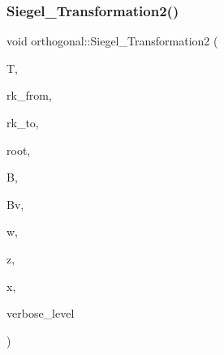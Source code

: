 \subsubsection{\texorpdfstring{Siegel\+\_\+\+Transformation2()}{Siegel\_Transformation2()}}
{\footnotesize\ttfamily void orthogonal\+::\+Siegel\+\_\+\+Transformation2 (\begin{DoxyParamCaption}\item[{\mbox{\hyperlink{galois_8h_a09fddde158a3a20bd2dcadb609de11dc}{I\+NT}} $\ast$}]{T,  }\item[{\mbox{\hyperlink{galois_8h_a09fddde158a3a20bd2dcadb609de11dc}{I\+NT}}}]{rk\+\_\+from,  }\item[{\mbox{\hyperlink{galois_8h_a09fddde158a3a20bd2dcadb609de11dc}{I\+NT}}}]{rk\+\_\+to,  }\item[{\mbox{\hyperlink{galois_8h_a09fddde158a3a20bd2dcadb609de11dc}{I\+NT}}}]{root,  }\item[{\mbox{\hyperlink{galois_8h_a09fddde158a3a20bd2dcadb609de11dc}{I\+NT}} $\ast$}]{B,  }\item[{\mbox{\hyperlink{galois_8h_a09fddde158a3a20bd2dcadb609de11dc}{I\+NT}} $\ast$}]{Bv,  }\item[{\mbox{\hyperlink{galois_8h_a09fddde158a3a20bd2dcadb609de11dc}{I\+NT}} $\ast$}]{w,  }\item[{\mbox{\hyperlink{galois_8h_a09fddde158a3a20bd2dcadb609de11dc}{I\+NT}} $\ast$}]{z,  }\item[{\mbox{\hyperlink{galois_8h_a09fddde158a3a20bd2dcadb609de11dc}{I\+NT}} $\ast$}]{x,  }\item[{\mbox{\hyperlink{galois_8h_a09fddde158a3a20bd2dcadb609de11dc}{I\+NT}}}]{verbose\+\_\+level }\end{DoxyParamCaption})}

\mbox{\label{classorthogonal_ac9129abf3f825e8c7d5591d1ba116ac7}} 
